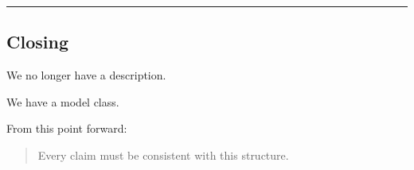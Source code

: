\documentclass[
  letterpaper,
  DIV=11,
  numbers=noendperiod]{scrartcl}
\begin{document}
\begin{center}\rule{0.5\linewidth}{0.5pt}\end{center}

\subsection{Closing}\label{closing}

We no longer have a description.

We have a model class.

From this point forward:

\begin{quote}
Every claim must be consistent with this structure.
\end{quote}
\end{document}
